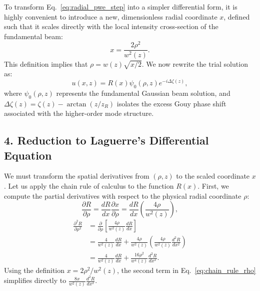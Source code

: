 \begin{resolucao}[Solution]
        To transform Eq.~\eqref{eq:radial_pwe_step} into a simpler differential form, it is highly convenient to introduce a new, dimensionless radial coordinate $x$, defined such that it scales directly with the local intensity cross-section of the fundamental beam:
        \begin{equation}
            x = \frac{2 \rho^2}{w^2(z)}.
            \label{eq:x_definition}
        \end{equation}
        This definition implies that $\rho = w(z)\sqrt{x/2}$. We now rewrite the trial solution as:
        \begin{equation}
            u(x, z) = R(x) \psi_0(\rho, z) e^{-i \Delta\zeta(z)},
        \end{equation}
        where $\psi_0(\rho, z)$ represents the fundamental Gaussian beam solution, and $\Delta\zeta(z) = \zeta(z) - \arctan(z/z_R)$ isolates the excess Gouy phase shift associated with the higher-order mode structure.

    \subsection*{4. Reduction to Laguerre's Differential Equation}

        We must transform the spatial derivatives from $(\rho, z)$ to the scaled coordinate $x$. Let us apply the chain rule of calculus to the function $R(x)$. First, we compute the partial derivatives with respect to the physical radial coordinate $\rho$:
        \[
        \frac{\partial R}{\partial \rho} = \frac{dR}{dx} \frac{\partial x}{\partial \rho} = \frac{dR}{dx} \left( \frac{4\rho}{w^2(z)} \right),
        \]
        \begin{equation}
            \begin{aligned}
                \frac{\partial^2 R}{\partial \rho^2}
                    &=
                    \frac{\partial}{\partial \rho}
                    \left[
                        \frac{4\rho}{w^2(z)}
                        \frac{dR}{dx}
                    \right]
                \\[4pt]
                    &=
                    \frac{4}{w^2(z)}
                    \frac{dR}{dx}
                    +
                    \frac{4\rho}{w^2(z)}
                    \left(
                        \frac{4\rho}{w^2(z)}
                        \frac{d^2R}{dx^2}
                    \right)
                \\[4pt]
                    &=
                    \frac{4}{w^2(z)}
                    \frac{dR}{dx}
                    +
                    \frac{16\rho^2}{w^4(z)}
                    \frac{d^2R}{dx^2}.
            \end{aligned}
            \label{eq:chain_rule_rho}
        \end{equation}
        Using the definition $x = 2\rho^2/w^2(z)$, the second term in Eq.~\eqref{eq:chain_rule_rho} simplifies directly to $\frac{8x}{w^2(z)}\frac{d^2 R}{dx^2}$.
        

\end{resolucao}
